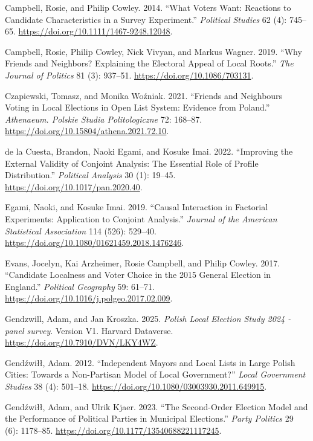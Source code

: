 \documentclass[
  letterpaper,
  DIV=11,
  numbers=noendperiod]{scrartcl}
\newlength{\cslhangindent}
\newenvironment{CSLReferences}[2] %
 {\begin{list}{}{%
  \setlength{\itemindent}{0pt}
  \setlength{\leftmargin}{0pt}
  \setlength{\parsep}{0pt}
  \ifodd #1
   \setlength{\leftmargin}{\cslhangindent}
   \setlength{\itemindent}{-1\cslhangindent}
  \fi
  \setlength{\itemsep}{#2\baselineskip}}}
 {\end{list}}
\begin{document}
\begin{CSLReferences}{1}{1}
Campbell, Rosie, and Philip Cowley. 2014. {``What Voters Want: Reactions
to Candidate Characteristics in a Survey Experiment.''} \emph{Political
Studies} 62 (4): 745--65. \url{https://doi.org/10.1111/1467-9248.12048}.

Campbell, Rosie, Philip Cowley, Nick Vivyan, and Markus Wagner. 2019.
{``Why Friends and Neighbors? Explaining the Electoral Appeal of Local
Roots.''} \emph{The Journal of Politics} 81 (3): 937--51.
\url{https://doi.org/10.1086/703131}.

Czapiewski, Tomasz, and Monika Woźniak. 2021. {``Friends and Neighbours
Voting in Local Elections in Open List System: Evidence from Poland.''}
\emph{Athenaeum. Polskie Studia Politologiczne} 72: 168--87.
\url{https://doi.org/10.15804/athena.2021.72.10}.

{de la Cuesta, Brandon, Naoki Egami, and Kosuke Imai}. 2022.
{``Improving the External Validity of Conjoint Analysis: The Essential
Role of Profile Distribution.''} \emph{Political Analysis} 30 (1):
19--45. \url{https://doi.org/10.1017/pan.2020.40}.

Egami, Naoki, and Kosuke Imai. 2019. {``Causal Interaction in Factorial
Experiments: Application to Conjoint Analysis.''} \emph{Journal of the
American Statistical Association} 114 (526): 529--40.
\url{https://doi.org/10.1080/01621459.2018.1476246}.

Evans, Jocelyn, Kai Arzheimer, Rosie Campbell, and Philip Cowley. 2017.
{``Candidate Localness and Voter Choice in the 2015 General Election in
England.''} \emph{Political Geography} 59: 61--71.
\url{https://doi.org/10.1016/j.polgeo.2017.02.009}.

Gendzwill, Adam, and Jan Kroszka. 2025. \emph{{Polish Local Election
Study 2024 - panel survey}}. Version V1. Harvard Dataverse.
\url{https://doi.org/10.7910/DVN/LKY4WZ}.

Gendźwiłł, Adam. 2012. {``Independent Mayors and Local Lists in Large
Polish Cities: Towards a Non-Partisan Model of Local Government?''}
\emph{Local Government Studies} 38 (4): 501--18.
\url{https://doi.org/10.1080/03003930.2011.649915}.

Gendźwiłł, Adam, and Ulrik Kjaer. 2023. {``The Second-Order Election
Model and the Performance of Political Parties in Municipal
Elections.''} \emph{Party Politics} 29 (6): 1178--85.
\url{https://doi.org/10.1177/13540688221117245}.


\end{CSLReferences}
\end{document}
